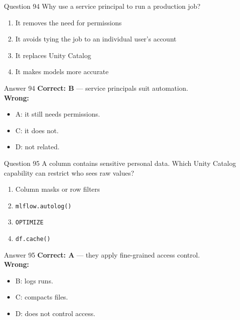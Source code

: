 \documentclass[aspectratio=169,11pt]{beamer}
\begin{document}
\begin{frame}{Question 94}
Why use a service principal to run a production job?
\begin{enumerate}[label=\Alph*.]
\item It removes the need for permissions
\item It avoids tying the job to an individual user's account
\item It replaces Unity Catalog
\item It makes models more accurate
\end{enumerate}
\end{frame}
\begin{frame}{Answer 94}
\textbf{Correct: B} --- service principals suit automation.\\
\vspace{0.5em}
\textbf{Wrong:}
\begin{itemize}
\item A: it still needs permissions.
\item C: it does not.
\item D: not related.
\end{itemize}
\end{frame}

\begin{frame}{Question 95}
A column contains sensitive personal data. Which Unity Catalog capability can restrict who sees raw values?
\begin{enumerate}[label=\Alph*.]
\item Column masks or row filters
\item \texttt{mlflow.autolog()}
\item \texttt{OPTIMIZE}
\item \texttt{df.cache()}
\end{enumerate}
\end{frame}
\begin{frame}{Answer 95}
\textbf{Correct: A} --- they apply fine-grained access control.\\
\vspace{0.5em}
\textbf{Wrong:}
\begin{itemize}
\item B: logs runs.
\item C: compacts files.
\item D: does not control access.
\end{itemize}
\end{frame}
\end{document}
